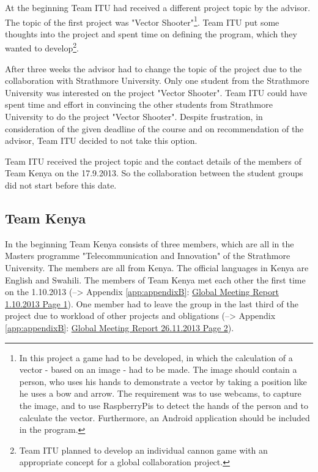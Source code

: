 At the beginning Team ITU had received a different project topic by the advisor. The topic of the first project was "Vector Shooter"\footnote{In this project a game had to be developed, in which the calculation of a vector - based on an image - had to be made. The image should contain a person, who uses his hands to demonstrate a vector by taking a position like he uses a bow and arrow. The requirement was to use webcams, to capture the image, and to use RaspberryPis to detect the hands of the person and to calculate the vector. Furthermore, an Android application should be included in the program.}. Team ITU put some thoughts into the project and spent time on defining the program, which they wanted to develop\footnote{Team ITU planned to develop an individual cannon game with an appropriate concept for a global collaboration project.}.

After three weeks the advisor had to change the topic of the project due to the collaboration with Strathmore University. Only one student from the Strathmore University was interested on the project "Vector Shooter". Team ITU could have spent time and effort in convincing the other students from Strathmore University to do the project "Vector Shooter". Despite frustration, in consideration of the given deadline of the course and on recommendation of the advisor, Team ITU decided to not take this option.

Team ITU received the project topic and the contact details of the members of Team Kenya on the 17.9.2013. So the collaboration between the student groups did not start before this date.


\subsection{Team Kenya}

In the beginning Team Kenya consists of three members, which are all in the Masters programme "Telecommunication and Innovation" of the Strathmore University. The members are all from Kenya. The official languages in Kenya are English and Swahili. The members of Team Kenya met each other the first time on the 1.10.2013 (--> Appendix \ref{app:appendixB}: \hyperlink{GSD20131001.1}{Global Meeting Report 1.10.2013 Page 1}). One member had to leave the group in the last third of the project due to workload of other projects and obligations (--> Appendix \ref{app:appendixB}: \hyperlink{GSD20131126.2}{Global Meeting Report 26.11.2013 Page 2}).


